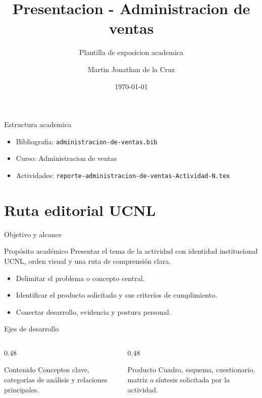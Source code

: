 ﻿\documentclass[spanish,aspectratio=169]{beamer}
\title{Presentacion - Administracion de ventas}
\subtitle{Plantilla de exposicion academica}
\author{Martin Jonathan de la Cruz}
\institute{Universidad Ciudadana de Nuevo Leon}
\date{\today}
\begin{document}
\begin{frame}
  \titlepage
\end{frame}

\begin{frame}{Estructura academica}
  \begin{itemize}
    \item Bibliografia: \texttt{administracion-de-ventas.bib}
    \item Curso: Administracion de ventas
    \item Actividades: \texttt{reporte-administracion-de-ventas-Actividad-N.tex}
  \end{itemize}
\end{frame}


\section{Ruta editorial UCNL}

\begin{frame}{Objetivo y alcance}
  \begin{block}{Propósito académico}
    Presentar el tema de la actividad con identidad institucional UCNL, orden visual y una ruta de comprensión clara.
  \end{block}
  \begin{itemize}
    \item Delimitar el problema o concepto central.
    \item Identificar el producto solicitado y sus criterios de cumplimiento.
    \item Conectar desarrollo, evidencia y postura personal.
  \end{itemize}
\end{frame}

\begin{frame}{Ejes de desarrollo}
  \begin{columns}[T,totalwidth=\textwidth]
    \begin{column}{0.48\textwidth}
      \begin{block}{Contenido}
        Conceptos clave, categorías de análisis y relaciones principales.
      \end{block}
    \end{column}
    \begin{column}{0.48\textwidth}
      \begin{block}{Producto}
        Cuadro, esquema, cuestionario, matriz o síntesis solicitada por la actividad.
      \end{block}
    \end{column}
  \end{columns}
\end{frame}
\end{document}
